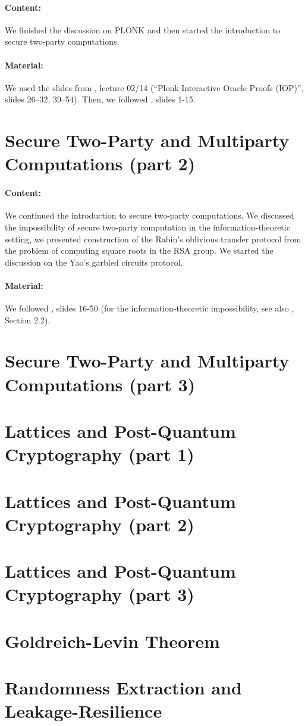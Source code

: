 \documentclass{llncs}
\begin{document}
\paragraph{Content:} We finished the discussion on PLONK and then started the introduction to secure two-party computations.

\paragraph{Material:}  We used the slides from \cite{ZKlearning}, lecture 02/14 (``Plonk Interactive Oracle Proofs (IOP)'', slides 26--32, 39--54). Then, we followed \cite{MPC}, slides 1-15.


\section{Secure Two-Party and Multiparty Computations (part 2)}

\paragraph{Content:}
We continued the introduction to secure two-party computations. We discussed the impossibility of secure two-party computation in the information-theoretic setting, we presented construction of the Rabin's oblivious transfer protocol from the problem of computing square roots in the RSA group. We started the discussion on the Yao's garbled circuits protocol.

\paragraph{Material:} We followed \cite{MPC}, slides 16-50 (for the information-theoretic impossibility, see also \cite{Wichs17}, Section 2.2).

\section{Secure Two-Party and Multiparty Computations (part 3)}

\section{Lattices and Post-Quantum Cryptography (part 1)}

\section{Lattices and Post-Quantum Cryptography (part 2)}

\section{Lattices and Post-Quantum Cryptography (part 3)}

\section{Goldreich-Levin Theorem}

\section{Randomness Extraction and Leakage-Resilience}


\printbibliography %
\end{document}
